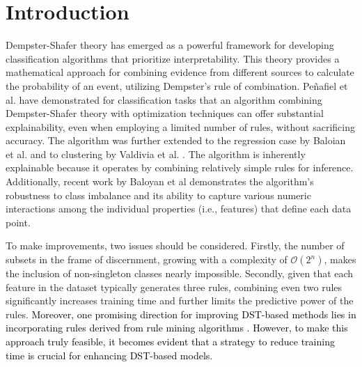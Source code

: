 \documentclass[10pt,a4paper,oneside]{article}
\begin{document}
{\selectfont
\begin{keywords}
{\fontsize{9pt}{9pt}\selectfont{
Dempster-Shafer Theory, Interpretability, KMeans, Mass Assignment Functions, Classification}}
\end{keywords}
}

{\selectfont
\begin{category}
{\fontsize{9pt}{9pt}\selectfont{
I.2.6, I.5, G.3
}}
\end{category}}

{\selectfont
\begin{doi}
{\fontsize{9pt}{9pt}\selectfont{
10.3897/jucs.164745}}
\end{doi}}



\section{Introduction}\label{sec1}
Dempster-Shafer theory \cite{dst} has emerged as a powerful framework for developing classification algorithms that prioritize interpretability. This theory provides a mathematical approach for combining evidence from different sources to calculate the probability of an event, utilizing Dempster's rule of combination. Peñafiel et al. \cite{sergio} have demonstrated {\color{black} for classification tasks} that an algorithm combining Dempster-Shafer theory with optimization techniques can offer substantial explainability, even when employing a limited number of rules, without sacrificing accuracy. {\color{black} The algorithm was further extended to the regression case by Baloian et al. \cite{Nelson} and to clustering by Valdivia et al. \cite{dsClustering}}. The algorithm is inherently explainable because it operates by combining relatively simple rules for inference. {\color{black}Additionally, recent work by Baloyan et al \cite{Aneta} demonstrates {\color{black}the} algorithm's robustness to class imbalance and its ability to capture various numeric interactions {\color{black} among the individual properties (i.e., features) that define each data point.}}

To make improvements, two issues should be considered.  Firstly, the number of subsets in the frame of discernment, growing with a complexity of $\mathcal{O}(2^n)$, makes the inclusion of non-singleton classes nearly impossible. Secondly, given that each feature in the dataset typically generates three rules, combining even two rules significantly increases training time and further limits the predictive power of the rules. 
\textcolor{black}
{
Moreover, one promising direction for improving DST-based methods lies in incorporating rules derived from rule mining algorithms \cite{ripper, c5, skoperules}. However, to make this approach truly feasible, it becomes evident that a strategy to reduce training time is crucial for enhancing DST-based models.
}
\end{document}
